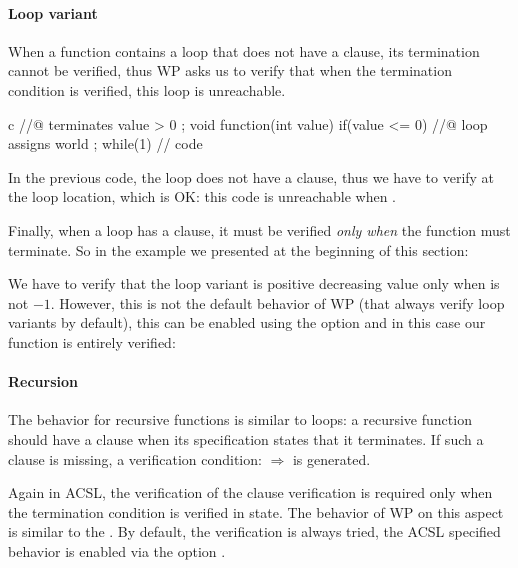 \paragraph{Loop variant}



When a function contains a loop that does not have a 
clause, its termination cannot be verified, thus WP asks us to verify that when
the termination condition is verified, this loop is unreachable.



\begin{CodeBlock}{c}
//@ terminates value > 0 ;
void function(int value){
  if(value <= 0){
    //@ loop assigns world ;
    while(1){
      // code
    }
  }
}
\end{CodeBlock}



In the previous code, the loop does not have a 
clause, thus we have to verify 
at the loop location, which is OK: this code is unreachable when
.



Finally, when a loop has a  clause, it must be
verified {\em only when} the function must terminate. So in the example
we presented at the beginning of this section:






We have to verify that the loop variant is positive decreasing value only
when  is not $-1$. However, this is not the default
behavior of WP (that always verify loop variants by default), this can
be enabled using the option  and
in this case our function is entirely verified:





\paragraph{Recursion}


The behavior for recursive functions is similar to loops: a recursive function
should have a  clause when its specification states that
it terminates. If such a clause is missing, a verification condition:
 $\Rightarrow$ 
is generated.




Again in ACSL, the verification of the  clause
verification is required only when the termination condition is verified in
 state. The behavior of WP on this aspect is similar to the
. By default, the verification is always tried, the
ACSL specified behavior is enabled via the option
.


